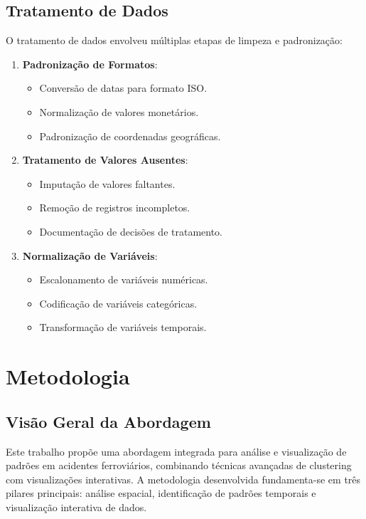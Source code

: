 \documentclass[conference]{IEEEtran}
\begin{document}
\subsection{Tratamento de Dados}
O tratamento de dados envolveu múltiplas etapas de limpeza e padronização:

\begin{enumerate}
\item \textbf{Padronização de Formatos}:
   \begin{itemize}
   \item Conversão de datas para formato ISO.
   \item Normalização de valores monetários.
   \item Padronização de coordenadas geográficas.
   \end{itemize}

\item \textbf{Tratamento de Valores Ausentes}:
   \begin{itemize}
   \item Imputação de valores faltantes.
   \item Remoção de registros incompletos.
   \item Documentação de decisões de tratamento.
   \end{itemize}

\item \textbf{Normalização de Variáveis}:
   \begin{itemize}
   \item Escalonamento de variáveis numéricas.
   \item Codificação de variáveis categóricas.
   \item Transformação de variáveis temporais.
   \end{itemize}
\end{enumerate}

\section{Metodologia}

\subsection{Visão Geral da Abordagem}
Este trabalho propõe uma abordagem integrada para análise e visualização de padrões em acidentes ferroviários, combinando técnicas avançadas de clustering com visualizações interativas. A metodologia desenvolvida fundamenta-se em três pilares principais: análise espacial, identificação de padrões temporais e visualização interativa de dados.
\end{document}
